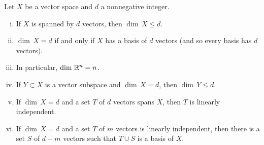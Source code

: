 \pagebreak[2]
\begin{prop} \label{mv:dimprop}
Let $X$ be a vector space and $d$ a nonnegative integer.
\begin{enumerate}[(i)]
\item \label{mv:dimprop:i}
If $X$ is spanned by $d$ vectors, then $\dim \, X \leq d$.
\item \label{mv:dimprop:ii}
$\dim \, X = d$ if and only if $X$ has a basis of $d$
vectors (and so every basis has $d$ vectors).
\item \label{mv:dimprop:iii}
In particular, $\dim \, {\mathbb{R}}^n = n$.
\item \label{mv:dimprop:iv}
If $Y \subset X$ is a vector subspace and $\dim \, X = d$,
then $\dim \, Y \leq d$.
\item \label{mv:dimprop:v}
If $\dim \, X = d$ and a set $T$ of $d$ vectors spans $X$,
then $T$ is linearly independent.
\item \label{mv:dimprop:vi}
If $\dim \, X = d$ and a set $T$ of $m$ vectors is
linearly independent, then there is a set $S$ of $d-m$
vectors such that $T \cup S$ is a basis of $X$.
\end{enumerate}
\end{prop}

